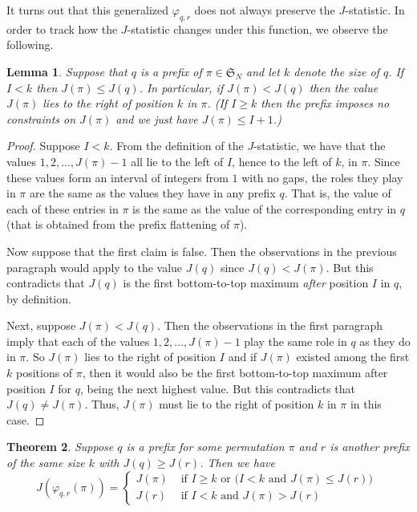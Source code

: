 \documentclass[11pt]{amsart}   %
\newtheorem{theorem}{Theorem}[section]
\newtheorem{lemma}[theorem]{Lemma}
\theoremstyle{definition}
\theoremstyle{remark}
\numberwithin{equation}{section}
\theoremstyle{theorem}
\newcommand{\f}[0]{\varphi}
\newcommand{\SN}{\mathfrak{S}}
\begin{document}
It turns out that this generalized $\f_{q,r}$ does not always preserve the $J$-statistic.  In order to track how the $J$-statistic changes under this function, we observe the following.

\begin{lemma}\label{l:pj}
Suppose that $q$ is a prefix of $\pi \in \SN_N$ and let $k$ denote the size of $q$.  If $I < k$ then $J(\pi) \leq J(q)$.  In particular, if $J(\pi) < J(q)$ then the value $J(\pi)$ lies to the right of position $k$ in $\pi$.  (If $I \geq k$ then the prefix imposes no constraints on $J(\pi)$ and we just have $J(\pi) \leq I+1$.)
\end{lemma}
\begin{proof}
Suppose $I < k$.  From the definition of the $J$-statistic, we have that the
values $1, 2, \ldots, J(\pi)-1$ all lie to the left of $I$, hence to the left
of $k$, in $\pi$.  Since these values form an interval of integers from $1$
with no gaps, the roles they play in $\pi$ are the same as the values they have
in any prefix $q$.  That is, the value of each of these entries in $\pi$ is the
same as the value of the corresponding entry in $q$ (that is obtained from the
prefix flattening of $\pi$).

Now suppose that the first claim is false.  Then the observations in the
previous paragraph would apply to the value $J(q)$ since $J(q) < J(\pi)$.  But
this contradicts that $J(q)$ is the first bottom-to-top maximum {\em
after} position $I$ in $q$, by definition.

Next, suppose $J(\pi) < J(q)$.  Then the observations in the first paragraph
imply that each of the values $1, 2, \ldots, J(\pi)-1$ play the same role in
$q$ as they do in $\pi$.  So $J(\pi)$ lies to the right of position $I$ and if
$J(\pi)$ existed among the first $k$ positions of $\pi$, then it would also be
the first bottom-to-top maximum after position $I$ for $q$, being the next
highest value.  But this contradicts that $J(q) \neq J(\pi)$.  Thus, $J(\pi)$
must lie to the right of position $k$ in $\pi$ in this case.
\end{proof}

\begin{theorem}\label{t:sqr}
Suppose $q$ is a prefix for some permutation $\pi$ and $r$ is another prefix of the same size $k$ with $J(q) \geq J(r)$.  Then we have 
    \[
        J(\f_{q,r}(\pi)) = \begin{cases}
            J(\pi) & \text{ if $I \geq k$ or ($I < k$ and $J(\pi) \leq J(r)$) } \\
            J(r) & \text{ if $I < k$ and $J(\pi) > J(r)$ }
        \end{cases}
    \]
\end{theorem}
\end{document}
